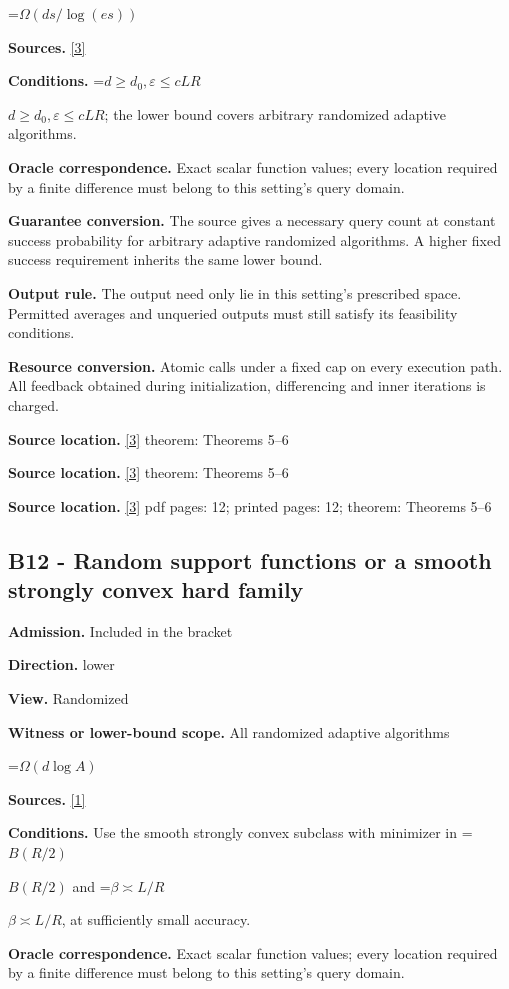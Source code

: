\documentclass[10pt,a4paper]{article}
\newcommand{\AtlasMath}[1]{\par\begingroup\centering\setbox0=\hbox{$\displaystyle #1$}\ifdim\wd0>1.4\linewidth\typeout{ATLAS WIDE FORMULA: \the\wd0}\fi\ifdim\wd0>\linewidth\resizebox{\linewidth}{!}{\box0}\else\box0\fi\par\endgroup}
\newcommand{\AtlasInlineMath}[1]{\begingroup\setbox0=\hbox{$#1$}\ifdim\wd0>.4\linewidth\endgroup\AtlasMath{#1}\else\endgroup$#1$\fi}
\begin{document}
\AtlasMath{\Omega(ds/\log(es))}
\textbf{Sources.} \href{https://arxiv.org/html/2607.16558v2}{[3]}

\textbf{Conditions.} \AtlasInlineMath{d\ge d_0,\varepsilon\le cLR}; the lower bound covers arbitrary randomized adaptive algorithms.

\textbf{Oracle correspondence.} Exact scalar function values; every location required by a finite difference must belong to this setting's query domain.

\textbf{Guarantee conversion.} The source gives a necessary query count at constant success probability for arbitrary adaptive randomized algorithms. A higher fixed success requirement inherits the same lower bound.

\textbf{Output rule.} The output need only lie in this setting's prescribed space. Permitted averages and unqueried outputs must still satisfy its feasibility conditions.

\textbf{Resource conversion.} Atomic calls under a fixed cap on every execution path. All feedback obtained during initialization, differencing and inner iterations is charged.

\textbf{Source location.} \href{https://arxiv.org/html/2607.16558v2}{[3]} theorem: Theorems 5--6

\textbf{Source location.} \href{https://arxiv.org/html/2607.16558v2}{[3]} theorem: Theorems 5--6

\textbf{Source location.} \href{https://arxiv.org/html/2607.16558v2}{[3]} pdf pages: 12; printed pages: 12; theorem: Theorems 5--6

\subsection{B12 - Random support functions or a smooth strongly convex hard family}
\textbf{Admission.} Included in the bracket

\textbf{Direction.} lower

\textbf{View.} Randomized

\textbf{Witness or lower-bound scope.} All randomized adaptive algorithms

\AtlasMath{\Omega(d\log A)}
\textbf{Sources.} \href{https://arxiv.org/html/2610.00345v1}{[1]}

\textbf{Conditions.} Use the smooth strongly convex subclass with minimizer in \AtlasInlineMath{B(R/2)} and \AtlasInlineMath{\beta \asymp L/R}, at sufficiently small accuracy.

\textbf{Oracle correspondence.} Exact scalar function values; every location required by a finite difference must belong to this setting's query domain.
\end{document}
